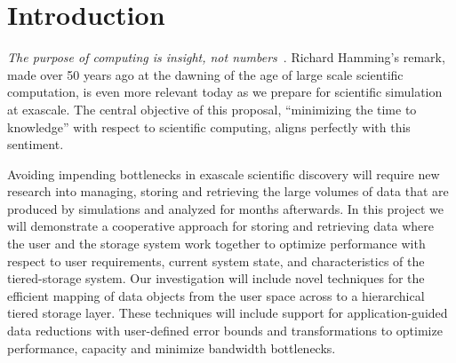 \section{Introduction} 
\label{sec:introduction}

{\em The purpose of computing is insight, not numbers}~\cite{Hamming:book}.
Richard Hamming's remark, made over 50 years ago at the dawning of the age of
large scale scientific computation, is even more relevant today as we prepare
for scientific simulation at exascale. 
The central objective of this proposal, ``minimizing the time to knowledge''  
with respect to scientific computing, aligns perfectly with this sentiment. 

Avoiding impending bottlenecks in exascale scientific discovery will require
new research into managing, storing and retrieving the large volumes of data that are 
produced by simulations and analyzed for months afterwards.
%
In this project we will demonstrate a cooperative approach for storing and retrieving  data
where the user and the storage system work together to optimize performance with
respect to user requirements, current system state, and characteristics of the tiered-storage system.
Our investigation will include  novel techniques for the efficient mapping of data objects
from the user space across to a hierarchical tiered storage layer. These techniques will
include support for application-guided data reductions with user-defined error bounds
and transformations to optimize performance, capacity and minimize bandwidth bottlenecks.


